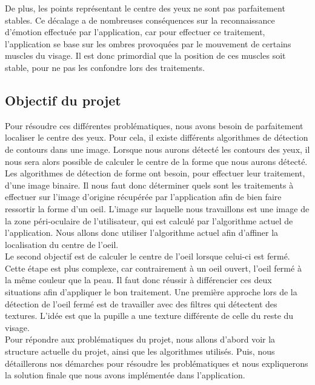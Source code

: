 De plus, les points représentant le centre des yeux ne sont pas parfaitement stables. Ce décalage a de 
nombreuses conséquences sur la reconnaissance d'émotion effectuée par l'application, car pour effectuer
ce traitement, l'application se base sur les ombres provoquées par le mouvement de certains muscles du 
visage. Il est donc primordial que la position de ces muscles soit stable, pour ne pas les confondre
lors des traitements.\\

\subsection{Objectif du projet}
Pour résoudre ces différentes problématiques, nous avons besoin de parfaitement localiser le centre des
yeux. Pour cela, il existe différents algorithmes de détection de contours dans une image. Lorsque nous aurons
détecté les contours des yeux, il nous sera alors possible de calculer le centre de la forme
que nous aurons détecté. Les algorithmes de détection de forme ont besoin, pour effectuer leur traitement,
d'une image binaire. Il nous faut donc déterminer quels sont les traitements à effectuer
sur l'image d'origine récupérée par l'application afin de bien faire ressortir la forme d'un oeil. L'image
sur laquelle nous travaillons est une image de la zone péri-oculaire de l'utilisateur, qui est calculé par
l'algorithme actuel de l'application. Nous allons donc utiliser l'algorithme actuel afin d'affiner la localisation
du centre de l'oeil.\\

Le second objectif est de calculer le centre de l'oeil lorsque celui-ci est fermé. Cette étape est plus complexe,
car contrairement à un oeil ouvert, l'oeil fermé à la même couleur que la peau. Il faut donc réussir à différencier ces
deux situations afin d'appliquer le bon traitement. Une première approche lors de la détection de l'oeil fermé est 
de travailler avec des filtres qui détectent des textures. L'idée est que la pupille a une texture différente de celle 
du reste du visage.\\

Pour répondre aux problématiques du projet, nous allons d'abord voir la structure actuelle du projet, ainsi que les algorithmes
utilisés. Puis, nous détaillerons nos démarches pour résoudre les problématiques et nous expliquerons la solution finale que nous avons
implémentée dans l'application.

\newpage

